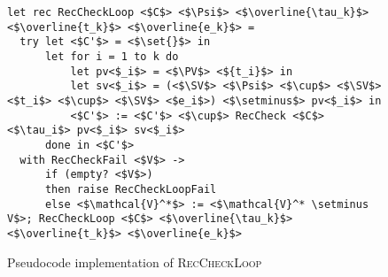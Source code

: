 \begin{figure}
\centering

\begin{verbatim}
let rec RecCheckLoop <$C$> <$\Psi$> <$\overline{\tau_k}$> <$\overline{t_k}$> <$\overline{e_k}$> =
  try let <$C'$> = <$\set{}$> in
      let for i = 1 to k do
          let pv<$_i$> = <$\PV$> <${t_i}$> in
          let sv<$_i$> = (<$\SV$> <$\Psi$> <$\cup$> <$\SV$> <$t_i$> <$\cup$> <$\SV$> <$e_i$>) <$\setminus$> pv<$_i$> in
          <$C'$> := <$C'$> <$\cup$> RecCheck <$C$> <$\tau_i$> pv<$_i$> sv<$_i$>
      done in <$C'$>
  with RecCheckFail <$V$> ->
      if (empty? <$V$>)
      then raise RecCheckLoopFail
      else <$\mathcal{V}^*$> := <$\mathcal{V}^* \setminus V$>; RecCheckLoop <$C$> <$\overline{\tau_k}$> <$\overline{t_k}$> <$\overline{e_k}$>
\end{verbatim}

\caption{Pseudocode implementation of \textsc{RecCheckLoop}}
\label{fig:helpers}
\end{figure}
